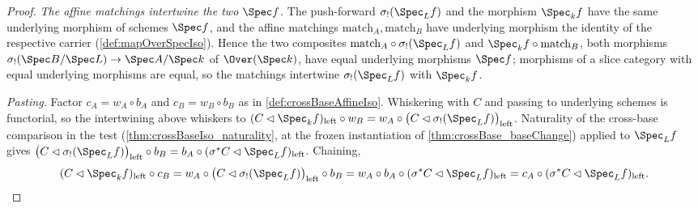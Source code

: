 \begin{proof}
  \leanok
  \emph{The affine matchings intertwine the two \(\Spec f\).} The push-forward
  \(\sigma_{!}(\Spec_L f)\) and the morphism \(\Spec_k f\) have the same underlying
  morphism of schemes \(\Spec f\), and the affine matchings
  \(\mathrm{match}_A, \mathrm{match}_B\) have underlying morphism the identity of the
  respective carrier (\ref{def:mapOverSpecIso}). Hence the two composites
  \(\mathrm{match}_A \circ \sigma_{!}(\Spec_L f)\) and
  \(\Spec_k f \circ \mathrm{match}_B\), both morphisms
  \(\sigma_{!}(\Spec B/\Spec L) \to \Spec A/\Spec k\) of \(\Over(\Spec k)\), have equal
  underlying morphisms \(\Spec f\); morphisms of a slice category with equal underlying
  morphisms are equal, so the matchings intertwine \(\sigma_{!}(\Spec_L f)\) with
  \(\Spec_k f\).

  \emph{Pasting.} Factor \(c_A = w_A \circ b_A\) and \(c_B = w_B \circ b_B\) as in
  \ref{def:crossBaseAffineIso}. Whiskering with \(C\) and passing to underlying schemes
  is functorial, so the intertwining above whiskers to
  \((C \lhd \Spec_k f)_{\mathrm{left}} \circ w_B
    = w_A \circ \bigl(C \lhd \sigma_{!}(\Spec_L f)\bigr)_{\mathrm{left}}\).
  Naturality of the cross-base comparison in the test
  (\ref{thm:crossBaseIso_naturality}, at the frozen instantiation of
  \ref{thm:crossBase_baseChange}) applied to \(\Spec_L f\) gives
  \(\bigl(C \lhd \sigma_{!}(\Spec_L f)\bigr)_{\mathrm{left}} \circ b_B
    = b_A \circ (\sigma^{*}C \lhd \Spec_L f)_{\mathrm{left}}\).
  Chaining,
  \[
    (C \lhd \Spec_k f)_{\mathrm{left}} \circ c_B
      = w_A \circ \bigl(C \lhd \sigma_{!}(\Spec_L f)\bigr)_{\mathrm{left}} \circ b_B
      = w_A \circ b_A \circ (\sigma^{*}C \lhd \Spec_L f)_{\mathrm{left}}
      = c_A \circ (\sigma^{*}C \lhd \Spec_L f)_{\mathrm{left}} . \qedhere
  \]
\end{proof}

